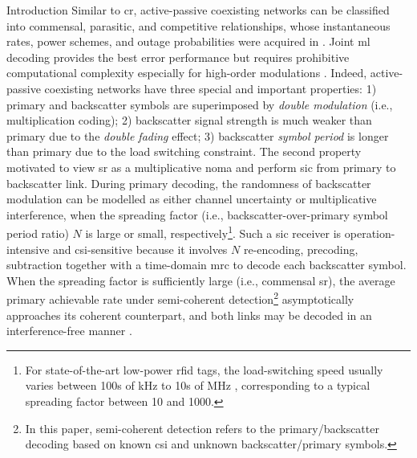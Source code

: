 \documentclass[journal,12pt,onecolumn,draftclsnofoot]{IEEEtran}
\theoremstyle{remark}
\begin{document}
\begin{section}{Introduction}
	Similar to \gls{cr}, active-passive coexisting networks can be classified into commensal, parasitic, and competitive relationships, whose instantaneous rates, power schemes, and outage probabilities were acquired in \cite{Guo2019b,Ding2020}.
	Joint \gls{ml} decoding provides the best error performance but requires prohibitive computational complexity especially for high-order modulations \cite{Yang2018}.
	Indeed, active-passive coexisting networks have three special and important properties:
	1) primary and backscatter symbols are superimposed by \emph{double modulation} (i.e., multiplication coding);
	2) backscatter signal strength is much weaker than primary due to the \emph{double fading} effect;
	3) backscatter \emph{symbol period} is longer than primary due to the load switching constraint.
	The second property motivated \cite{Long2020a,Liang2020,Guo2019b,Ding2020,Zhou2019a,Wu2021a,Xu2021a,Yang2021a,Yang2018,Han2021,Zhang2022} to view \gls{sr} as a multiplicative \gls{noma} and perform \gls{sic} from primary to backscatter link.
	During primary decoding, the randomness of backscatter modulation can be modelled as either channel uncertainty or multiplicative interference, when the spreading factor (i.e., backscatter-over-primary symbol period ratio) $N$ is large or small, respectively\footnote{For state-of-the-art low-power \gls{rfid} tags, the load-switching speed usually varies between \num{100}s of \unit{\kHz} to \num{10}s of \unit{\MHz} \cite{Torres2021}, corresponding to a typical spreading factor between \num{10} and \num{1000}.}.
	Such a \gls{sic} receiver is operation-intensive and \gls{csi}-sensitive because it involves $N$ re-encoding, precoding, subtraction together with a time-domain \gls{mrc} to decode each backscatter symbol.
	When the spreading factor is sufficiently large (i.e., commensal \gls{sr}), the average primary achievable rate under semi-coherent detection\footnote{In this paper, semi-coherent detection refers to the primary/backscatter decoding based on known \gls{csi} and unknown backscatter/primary symbols.} asymptotically approaches its coherent counterpart, and both links may be decoded in an interference-free manner \cite{Long2020a}.

\end{section}
\end{document}

